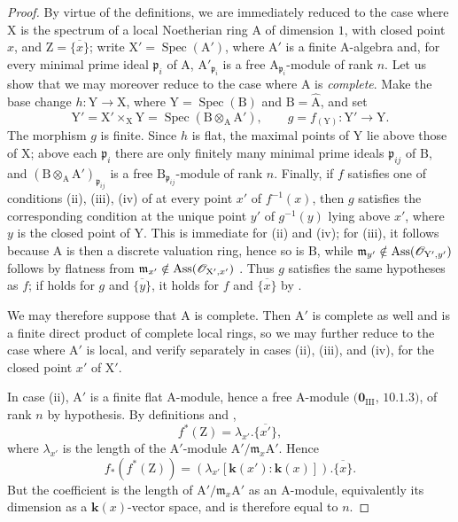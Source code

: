 \begin{proof}
By virtue of the definitions, we are immediately reduced to the case where $\mathrm{X}$ is the spectrum of a local Noetherian ring $\mathrm{A}$ of dimension $1$, with closed point $x$, and $\mathrm{Z}=\overline{\{x\}}$; write $\mathrm{X}'=\operatorname{Spec}(\mathrm{A}')$, where $\mathrm{A}'$ is a finite A-algebra and, for every minimal prime ideal $\mathfrak{p}_i$ of $\mathrm{A}$, $\mathrm{A}'_{\mathfrak{p}_i}$ is a free $\mathrm{A}_{\mathfrak{p}_i}$-module of rank $n$.
Let us show that we may moreover reduce to the case where $\mathrm{A}$ is \emph{complete}.  Make the base change $h:\mathrm{Y}\to\mathrm{X}$, where $\mathrm{Y}=\operatorname{Spec}(\mathrm{B})$ and $\mathrm{B}=\widehat{\mathrm{A}}$, and set
\[
  \mathrm{Y}'=\mathrm{X}'\times_{\mathrm{X}}\mathrm{Y}
  =\operatorname{Spec}(\mathrm{B}\otimes_{\mathrm{A}}\mathrm{A}'),
  \qquad g=f_{(\mathrm{Y})}:\mathrm{Y}'\to\mathrm{Y}.
\]
The morphism $g$ is finite.  Since $h$ is flat, the maximal points of $\mathrm{Y}$ lie above those of $\mathrm{X}$; above each $\mathfrak{p}_i$ there are only finitely many minimal prime ideals $\mathfrak{p}_{ij}$ of $\mathrm{B}$, and $(\mathrm{B}\otimes_{\mathrm{A}}\mathrm{A}')_{\mathfrak{p}_{ij}}$ is a free $\mathrm{B}_{\mathfrak{p}_{ij}}$-module of rank $n$.
Finally, if $f$ satisfies one of conditions (ii), (iii), (iv) of  at every point $x'$ of $f^{-1}(x)$, then $g$ satisfies the corresponding condition at the unique point $y'$ of $g^{-1}(y)$ lying above $x'$, where $y$ is the closed point of $\mathrm{Y}$.  This is immediate for (ii) and (iv); for (iii), it follows because $\mathrm{A}$ is then a discrete valuation ring, hence so is $\mathrm{B}$, while
$\mathfrak{m}_{y'}\notin\operatorname{Ass}(\mathscr{O}_{\mathrm{Y}',y'})$ follows by flatness from $\mathfrak{m}_{x'}\notin\operatorname{Ass}(\mathscr{O}_{\mathrm{X}',x'})$ .
Thus $g$ satisfies the same hypotheses as $f$; if  holds for $g$ and $\overline{\{y\}}$, it holds for $f$ and $\overline{\{x\}}$ by .

We may therefore suppose that $\mathrm{A}$ is complete.  Then $\mathrm{A}'$ is complete as well and is a finite direct product of complete local rings, so we may further reduce to the case where $\mathrm{A}'$ is local, and verify  separately in cases (ii), (iii), and (iv), for the closed point $x'$ of $\mathrm{X}'$.

In case (ii), $\mathrm{A}'$ is a finite flat A-module, hence a free A-module $(\mathbf{0}_{\mathrm{III}}$, $10.1.3)$, of rank $n$ by hypothesis.  By definitions  and ,
\[
  f^*(\mathrm{Z})=\lambda_{x'}.\overline{\{x'\}},
\]
where $\lambda_{x'}$ is the length of the $\mathrm{A}'$-module $\mathrm{A}'/\mathfrak{m}_x\mathrm{A}'$.  Hence
\[
  f_*(f^*(\mathrm{Z}))
  =(\lambda_{x'}[\boldsymbol{k}(x'):\boldsymbol{k}(x)]).\overline{\{x\}}.
\]
But the coefficient is the length of $\mathrm{A}'/\mathfrak{m}_x\mathrm{A}'$ as an A-module, equivalently its dimension as a $\boldsymbol{k}(x)$-vector space, and is therefore equal to $n$.


\end{proof}
